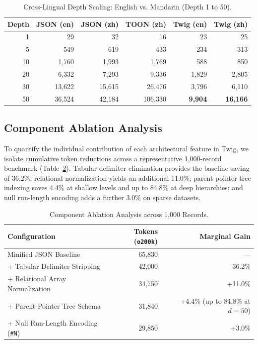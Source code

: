 \documentclass[11pt,a4paper]{article}
\begin{document}
\begin{table}[htbp]
\centering
\small
\caption{Cross-Lingual Depth Scaling: English vs. Mandarin (Depth 1 to 50).}
\label{tab:mandarin_comparison}
\begin{tabular}{rrrrrr}
\toprule
\textbf{Depth} & \textbf{JSON (en)} & \textbf{JSON (zh)} & \textbf{TOON (zh)} & \textbf{Twig (en)} & \textbf{Twig (zh)} \\
\midrule
1 & 29 & 32 & 16 & 23 & 25 \\
5 & 549 & 619 & 433 & 234 & 313 \\
10 & 1,760 & 1,993 & 1,769 & 588 & 850 \\
20 & 6,332 & 7,293 & 9,336 & 1,829 & 2,805 \\
30 & 13,622 & 15,615 & 26,476 & 3,796 & 6,110 \\
50 & 36,524 & 42,184 & 106,330 & \textbf{9,904} & \textbf{16,166} \\
\bottomrule
\end{tabular}
\end{table}

\subsection{Component Ablation Analysis}
To quantify the individual contribution of each architectural feature in Twig, we isolate cumulative token reductions across a representative 1,000-record benchmark (Table~\ref{tab:ablation}). Tabular delimiter elimination provides the baseline saving of 36.2\%; relational normalization yields an additional 11.0\%; parent-pointer tree indexing saves 4.4\% at shallow levels and up to 84.8\% at deep hierarchies; and null run-length encoding adds a further 3.0\% on sparse datasets.

\begin{table}[htbp]
\centering
\small
\caption{Component Ablation Analysis across 1,000 Records.}
\label{tab:ablation}
\begin{tabular}{lrr}
\toprule
\textbf{Configuration} & \textbf{Tokens (\texttt{o200k})} & \textbf{Marginal Gain} \\
\midrule
Minified JSON Baseline & 65,830 & --- \\
+ Tabular Delimiter Stripping & 42,000 & 36.2\% \\
+ Relational Array Normalization & 34,750 & +11.0\% \\
+ Parent-Pointer Tree Schema & 31,840 & +4.4\% (up to 84.8\% at $d=50$) \\
+ Null Run-Length Encoding (\texttt{\#N}) & 29,850 & +3.0\% \\
\bottomrule
\end{tabular}
\end{table}
\end{document}
